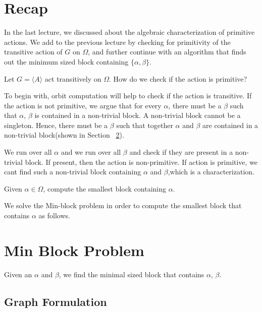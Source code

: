 



\section{Recap}
In the last lecture, we discussed about the algebraic characterization of primitive actions. We add to the previous lecture by checking for primitivity of the transitive action of $G$ on $\Omega$, and further continue with an algorithm that finds out the minimum sized block containing $\{\alpha,\beta\}$.

\begin{problem}
Let $G=\langle A \rangle$ act transitively on $\Omega$.
How do we check if the action is primitive?
\end{problem}

To begin with, orbit computation will help to check if the action is transitive. If the action is not primitive, we argue that for every $\alpha$, there must be a $\beta$ such that {$\alpha$, $\beta$} is contained in a non-trivial block.
A non-trivial block cannot be a singleton. Hence, there must be a $\beta$ such that together $\alpha$ and $\beta$ are contained in a non-trivial block(shown in Section ~\ref{sec:min-block}).

We run over all $\alpha$ and we run over all $\beta$ and check if they are present in a non-trivial block. If present, then the action is non-primitive. If action is primitive, we cant find such a non-trivial block containing $\alpha$ and $\beta$,which is a characterization.

\begin{problem}
Given $\alpha \in \Omega$, compute the smallest block containing $\alpha$.
\end{problem}

We solve the Min-block problem in order to compute the smallest block that contains $\alpha$ as follows.

\section{Min Block Problem}
\label{sec:min-block}
Given an $\alpha$ and $\beta$, we find the minimal sized block that contains {$\alpha$, $\beta$}.

\subsection{Graph Formulation}

